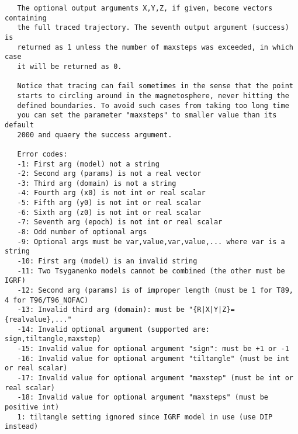 \documentclass[a4paper]{article}
\begin{document}
\begin{tscreen}
\begin{verbatim}
   The optional output arguments X,Y,Z, if given, become vectors containing
   the full traced trajectory. The seventh output argument (success) is
   returned as 1 unless the number of maxsteps was exceeded, in which case
   it will be returned as 0.
   
   Notice that tracing can fail sometimes in the sense that the point
   starts to circling around in the magnetosphere, never hitting the
   defined boundaries. To avoid such cases from taking too long time
   you can set the parameter "maxsteps" to smaller value than its default
   2000 and quaery the success argument.

   Error codes:
   -1: First arg (model) not a string
   -2: Second arg (params) is not a real vector
   -3: Third arg (domain) is not a string
   -4: Fourth arg (x0) is not int or real scalar
   -5: Fifth arg (y0) is not int or real scalar
   -6: Sixth arg (z0) is not int or real scalar
   -7: Seventh arg (epoch) is not int or real scalar
   -8: Odd number of optional args
   -9: Optional args must be var,value,var,value,... where var is a string
   -10: First arg (model) is an invalid string
   -11: Two Tsyganenko models cannot be combined (the other must be IGRF)
   -12: Second arg (params) is of improper length (must be 1 for T89, 4 for T96/T96_NOFAC)
   -13: Invalid third arg (domain): must be "{R|X|Y|Z}={realvalue},..."
   -14: Invalid optional argument (supported are: sign,tiltangle,maxstep)
   -15: Invalid value for optional argument "sign": must be +1 or -1
   -16: Invalid value for optional argument "tiltangle" (must be int or real scalar)
   -17: Invalid value for optional argument "maxstep" (must be int or real scalar)
   -18: Invalid value for optional argument "maxsteps" (must be positive int)
   1: tiltangle setting ignored since IGRF model in use (use DIP instead)
\end{verbatim}
\end{tscreen}
\end{document}

